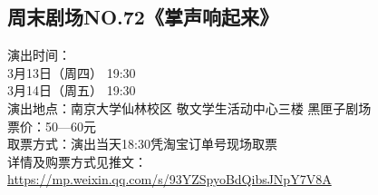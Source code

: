 \documentclass[letterpaper, 12pt]{article}
\begin{document}
\begin{multicols}{2}
\section{周末剧场NO.72《掌声响起来》}
演出时间：\\
3月13日（周四） 19:30\\
3月14日（周五） 19:30\\
演出地点：南京大学仙林校区 敬文学生活动中心三楼 黑匣子剧场\\
票价：50—60元\\
取票方式：演出当天18:30凭淘宝订单号现场取票\\
详情及购票方式见推文：\url{https://mp.weixin.qq.com/s/93YZSpyoBdQibsJNpY7V8A}
\end{multicols} 
\end{document}
